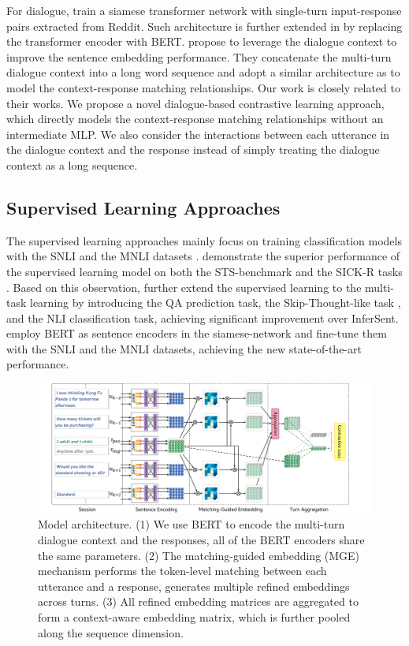 \documentclass[11pt]{article}
\begin{document}
For dialogue, \citet{co_dan} train a siamese transformer network with single-turn input-response pairs extracted from Reddit.
Such architecture is further extended in \cite{sent_bert} by replacing the transformer encoder with BERT.
\citet{convert} propose to leverage the dialogue context to improve the sentence embedding performance.
They concatenate the multi-turn dialogue context into a long word sequence and adopt a similar architecture as \cite{co_dan} to model the context-response matching relationships.
Our work is closely related to their works.
We propose a novel dialogue-based contrastive learning approach, which directly models the context-response matching relationships without an intermediate MLP.
We also consider the interactions between each utterance in the dialogue context and the response instead of simply treating the dialogue context as a long sequence.

\subsection{Supervised Learning Approaches}
The supervised learning approaches mainly focus on training classification models with the SNLI and the MNLI datasets \cite{snli, mnli}.
\citet{infer_sent} demonstrate the superior performance of the supervised learning model on both the STS-benchmark \cite{sts_b} and the SICK-R tasks \cite{sick_r}.
Based on this observation, \citet{use} further extend the supervised learning to the multi-task learning by introducing the QA prediction task, the Skip-Thought-like task \cite{henderson2017efficient,skip_thought}, and the NLI classification task, achieving significant improvement over InferSent.
\citet{sent_bert} employ BERT as sentence encoders in the siamese-network and fine-tune them with the SNLI and the MNLI datasets, achieving the new state-of-the-art performance.

\begin{figure}[thb]
  \centering
  \includegraphics[width=\linewidth]{figures/mainframe.pdf}
  \caption{Model architecture. (1) We use BERT to encode the multi-turn dialogue context and the responses, all of the BERT encoders share the same parameters. (2) The matching-guided embedding (MGE) mechanism performs the token-level matching between each utterance and a response, generates multiple refined embeddings across turns. (3) All refined embedding matrices are aggregated to form a context-aware embedding matrix, which is further pooled along the sequence dimension.}
  \label{figure:model}
\end{figure}
\end{document}
